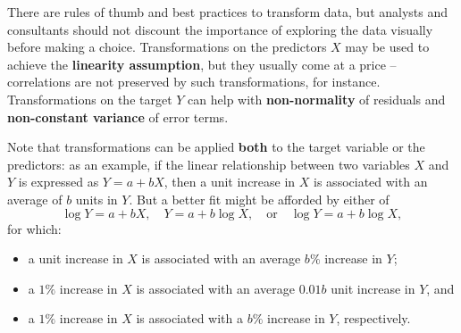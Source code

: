 \par There are rules of thumb and best practices to transform data, but analysts and consultants should not discount the importance of exploring the data visually before making a choice. \newl Transformations on the predictors $X$ may be used to achieve the \textbf{linearity assumption}, but they usually come at a price -- correlations are not preserved by such transformations, for instance. Transformations on the target $Y$ can help with \textbf{non-normality} of residuals and \textbf{non-constant variance} of error terms. \par Note that transformations can be applied \textbf{both} to the target variable or the predictors: as an example, if the linear relationship between two variables $X$ and $Y$ is expressed as $Y=a+bX$, then a unit increase in $X$ is associated with an average of $b$ units in $Y$. \newl But a better fit might be afforded by either of $$\log Y = a+bX,\quad Y=a+b\log X,\quad \mbox{or}\quad  \log Y = a+b\log X,$$ for which:
\begin{itemize}[noitemsep]
\item a unit increase in $X$ is associated with an average $b\%$ increase in $Y$;
\item a $1\%$ increase in $X$ is associated with an average $0.01b$ unit increase in $Y$, and
\item a $1\%$ increase in $X$ is associated with a $b\%$ increase in $Y$, respectively. 
\end{itemize}
